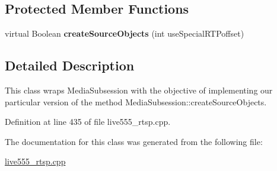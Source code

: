 \subsection*{Protected Member Functions}
\begin{DoxyCompactItemize}
\item 
virtual Boolean {\bfseries create\+Source\+Objects} (int use\+Special\+R\+T\+Poffset)\hypertarget{classSimpleClientMediaSubsession_af020c9ea462bd48ebba940e9c4714994}{}\label{classSimpleClientMediaSubsession_af020c9ea462bd48ebba940e9c4714994}

\end{DoxyCompactItemize}


\subsection{Detailed Description}
This class wraps Media\+Subsession with the objective of implementing our particular version of the method Media\+Subsession\+::create\+Source\+Objects. 

Definition at line 435 of file live555\+\_\+rtsp.\+cpp.



The documentation for this class was generated from the following file\+:\begin{DoxyCompactItemize}
\item 
\hyperlink{live555__rtsp_8cpp}{live555\+\_\+rtsp.\+cpp}\end{DoxyCompactItemize}
